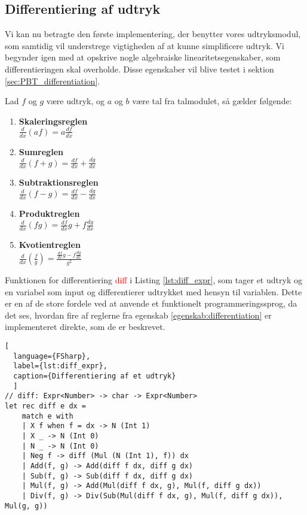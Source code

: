 \documentclass{article}
\begin{document}
\subsection{Differentiering af udtryk}
Vi kan nu betragte den første implementering, der benytter vores udtryksmodul, som samtidig vil understrege vigtigheden af at kunne simplificere udtryk. Vi begynder igen med at opskrive nogle algebraiske linearitetsegenskaber, som differentieringen skal overholde. Disse egenskaber vil blive testet i sektion \ref{sec:PBT_differentiation}.
\vspace{0.5cm}
\begin{egenskab}\label{egenskab:differentiation}
  Lad $f$ og $g$ være udtryk, og $a$ og $b$ være tal fra talmodulet, så gælder følgende:
  \begin{enumerate}
    \item \textbf{Skaleringsreglen} \\
    \(\frac{d}{dx}(af) = a\frac{df}{dx}\)
    \item \textbf{Sumreglen} \\
    \(\frac{d}{dx}(f+g) = \frac{df}{dx} + \frac{dg}{dx}\)
    \item \textbf{Subtraktionsreglen} \\
    \(\frac{d}{dx}(f-g) = \frac{df}{dx} - \frac{dg}{dx}\)
    \item \textbf{Produktreglen} \\
    \(\frac{d}{dx}(fg) = \frac{df}{dx}g + f\frac{dg}{dx}\)
    \item \textbf{Kvotientreglen} \\
    \(\frac{d}{dx}\left(\frac{f}{g}\right) = \frac{\frac{df}{dx}g - f\frac{dg}{dx}}{g^2}\)
  \end{enumerate}
\end{egenskab}

Funktionen for differentiering \textcolor{red}{diff} i Listing \ref{lst:diff_expr}, som tager et udtryk og en variabel som input og differentierer udtrykket med hensyn til variablen. Dette er en af de store fordele ved at anvende et funktionelt programmeringssprog, da det ses, hvordan fire af reglerne fra egenskab \ref{egenskab:differentiation} er implementeret direkte, som de er beskrevet.

\begin{lstlisting}[
  language={FSharp}, 
  label={lst:diff_expr}, 
  caption={Differentiering af et udtryk}
  ]
// diff: Expr<Number> -> char -> Expr<Number>
let rec diff e dx = 
    match e with
    | X f when f = dx -> N (Int 1)
    | X _ -> N (Int 0)
    | N _ -> N (Int 0)
    | Neg f -> diff (Mul (N (Int 1), f)) dx
    | Add(f, g) -> Add(diff f dx, diff g dx)
    | Sub(f, g) -> Sub(diff f dx, diff g dx)
    | Mul(f, g) -> Add(Mul(diff f dx, g), Mul(f, diff g dx))
    | Div(f, g) -> Div(Sub(Mul(diff f dx, g), Mul(f, diff g dx)), Mul(g, g))
\end{lstlisting}
\end{document}
